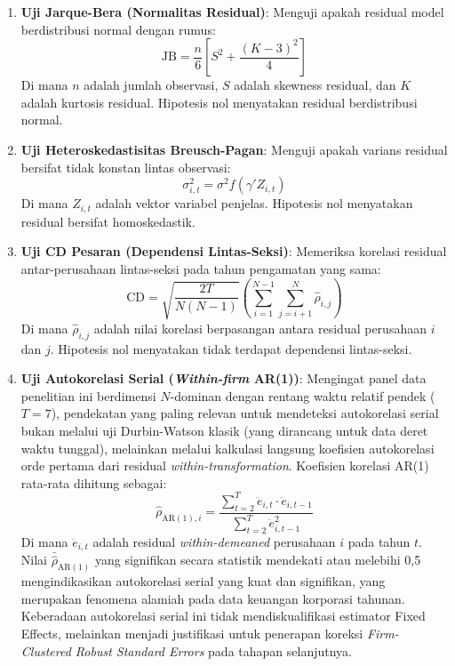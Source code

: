 \documentclass[12pt,a4paper]{article}
\begin{document}
\begin{enumerate}
\def\labelenumi{\arabic{enumi}.}
\item
  \textbf{Uji Jarque-Bera (Normalitas Residual)}: Menguji apakah
  residual model berdistribusi normal dengan rumus: \begin{equation}
  \mathrm{JB} = \frac{n}{6} \left[ S^2 + \frac{(K - 3)^2}{4} \right]
  \end{equation} Di mana \(n\) adalah jumlah observasi, \(S\) adalah
  skewness residual, dan \(K\) adalah kurtosis residual. Hipotesis nol
  menyatakan residual berdistribusi normal.
\item
  \textbf{Uji Heteroskedastisitas Breusch-Pagan}: Menguji apakah varians
  residual bersifat tidak konstan lintas observasi: \begin{equation}
  \sigma_{i,t}^2 = \sigma^2 f(\gamma' Z_{i,t})
  \end{equation} Di mana \(Z_{i,t}\) adalah vektor variabel penjelas.
  Hipotesis nol menyatakan residual bersifat homoskedastik.
\item
  \textbf{Uji CD Pesaran (Dependensi Lintas-Seksi)}: Memeriksa korelasi
  residual antar-perusahaan lintas-seksi pada tahun pengamatan yang
  sama: \begin{equation}
  \mathrm{CD} = \sqrt{\frac{2T}{N(N - 1)}} \left( \sum_{i=1}^{N-1} \sum_{j=i+1}^N \hat{\rho}_{i,j} \right)
  \end{equation} Di mana \(\hat{\rho}_{i,j}\) adalah nilai korelasi
  berpasangan antara residual perusahaan \(i\) dan \(j\). Hipotesis nol
  menyatakan tidak terdapat dependensi lintas-seksi.
\item
  \textbf{Uji Autokorelasi Serial (\emph{Within-firm} AR(1))}: Mengingat
  panel data penelitian ini berdimensi \(N\)-dominan dengan rentang
  waktu relatif pendek (\(T = 7\)), pendekatan yang paling relevan untuk
  mendeteksi autokorelasi serial bukan melalui uji Durbin-Watson klasik
  (yang dirancang untuk data deret waktu tunggal), melainkan melalui
  kalkulasi langsung koefisien autokorelasi orde pertama dari residual
  \emph{within-transformation}. Koefisien korelasi AR(1) rata-rata
  dihitung sebagai: \begin{equation}
  \hat{\rho}_{\mathrm{AR}(1),i} = \frac{\sum_{t=2}^{T} \ddot{e}_{i,t} \cdot \ddot{e}_{i,t-1}}{\sum_{t=2}^{T} \ddot{e}_{i,t-1}^2}
  \end{equation} Di mana \(\ddot{e}_{i,t}\) adalah residual
  \emph{within-demeaned} perusahaan \(i\) pada tahun \(t\). Nilai
  \(\bar{\hat{\rho}}_{\mathrm{AR}(1)}\) yang signifikan secara statistik
  mendekati atau melebihi 0,5 mengindikasikan autokorelasi serial yang
  kuat dan signifikan, yang merupakan fenomena alamiah pada data
  keuangan korporasi tahunan. Keberadaan autokorelasi serial ini tidak
  mendiskualifikasi estimator Fixed Effects, melainkan menjadi
  justifikasi untuk penerapan koreksi \emph{Firm-Clustered Robust
  Standard Errors} pada tahapan selanjutnya.
\end{enumerate}
\end{document}

